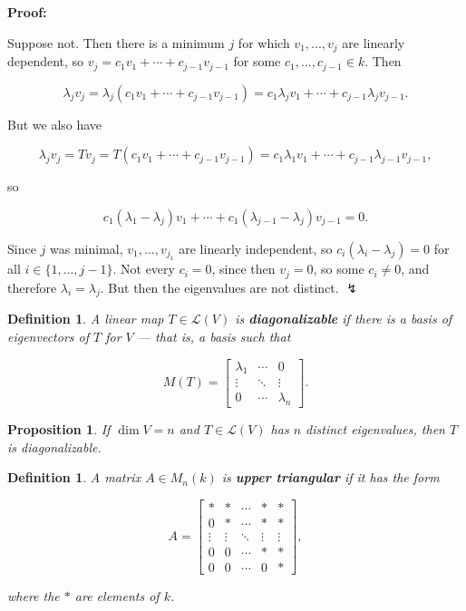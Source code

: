 \documentclass{article}
\theoremstyle{colontheorem}
\newtheorem{proposition}[theorem]{Proposition}
\newtheorem{definition}[theorem]{Definition}
\newenvironment{Proposition}
{
	\begin{mdframed}[backgroundcolor=TheoremOrange!10]
	\begin{proposition}
}
{
	\end{proposition}
	\end{mdframed}
	
	\vspace{.15in}
}
\newenvironment{Def}
{
	\begin{mdframed}[backgroundcolor=DefGreen!10]
	\begin{definition}
}
{
	\end{definition}
	\end{mdframed}
	
	\vspace{.15in}
}
\newenvironment{Proof}
{
	\vspace{-.3in}
	
	\begin{mdframed}[backgroundcolor=ProofPurple!10]
	\textbf{Proof:}%
}
{
	\end{mdframed}
	
	\vspace{.15in}
}
\begin{document}
\begin{Proof}
	Suppose not. Then there is a minimum $j$ for which $v_1, ..., v_j$ are linearly dependent, so $v_j = c_1 v_1 + \cdots + c_{j-1} v_{j-1}$ for some $c_1, ..., c_{j-1} \in k$. Then
	
	$$
		\lambda_j v_j = \lambda_j (c_1 v_1 + \cdots + c_{j-1} v_{j-1}) = c_1 \lambda_j v_1 + \cdots + c_{j-1} \lambda_j v_{j-1}.
	$$
	
	But we also have
	
	$$
		\lambda_j v_j = Tv_j = T(c_1 v_1 + \cdots + c_{j-1} v_{j-1}) = c_1 \lambda_1 v_1 + \cdots + c_{j-1} \lambda_{j-1} v_{j-1},
	$$
	
	so
	
	$$
		c_1(\lambda_1 - \lambda_j)v_1 + \cdots + c_1(\lambda_{j-1} - \lambda_j)v_{j-1} = 0.
	$$
	
	Since $j$ was minimal, $v_1, ..., v_{j_1}$ are linearly independent, so $c_i(\lambda_i - \lambda_j) = 0$ for all $i \in \{1, ..., j-1\}$. Not every $c_i = 0$, since then $v_j = 0$, so some $c_i \neq 0$, and therefore $\lambda_i = \lambda_j$. But then the eigenvalues are not distinct. $\lightning$
	
\end{Proof}



\begin{Def}
	
	A linear map $T \in \mathcal{L}(V)$ is \textbf{diagonalizable} if there is a basis of eigenvectors of $T$ for $V$ --- that is, a basis such that
	
	$$
		M(T) = \begin{bmatrix}
			\lambda_1 & \cdots & 0\\
			\vdots & \ddots & \vdots\\
			0 & \cdots & \lambda_n
		\end{bmatrix}.
	$$
	
\end{Def}



\begin{Proposition}
	
	If $\dim V = n$ and $T \in \mathcal{L}(V)$ has $n$ distinct eigenvalues, then $T$ is diagonalizable.
	
\end{Proposition}



\begin{Def}
	
	A matrix $A \in M_n(k)$ is \textbf{upper triangular} if it has the form
	
	$$
		A = \begin{bmatrix}
			* & * & \cdots & * & *\\
			0 & * & \cdots & * & *\\
			\vdots & \vdots & \ddots & \vdots & \vdots\\
			0 & 0 & \cdots & * & *\\
			0 & 0 & \cdots & 0 & *
		\end{bmatrix},
	$$
	
	where the $*$ are elements of $k$.
	
\end{Def}
\end{document}
